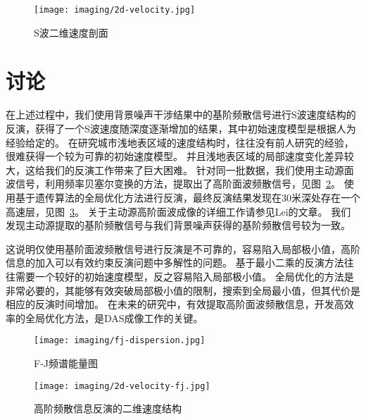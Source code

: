 \begin{figure}[h]
    \centering
    \texttt{[image: imaging/2d-velocity.jpg]}
    \caption{S波二维速度剖面}
    \label{fig:2d-velocity}
\end{figure}



\section{讨论}

在上述过程中，我们使用背景噪声干涉结果中的基阶频散信号进行S波速度结构的反演，获得了一个S波速度随深度逐渐增加的结果，其中初始速度模型是根据人为经验给定的。
在研究城市浅地表区域的速度结构时，往往没有前人研究的经验，很难获得一个较为可靠的初始速度模型。
并且浅地表区域的局部速度变化差异较大，这给我们的反演工作带来了巨大困难。
针对同一批数据，我们使用主动源面波信号，利用频率贝塞尔变换的方法，提取出了高阶面波频散信号，见图~\ref{fig:fj-dispersion}。
使用基于遗传算法的全局优化方法进行反演，最终反演结果发现在30米深处存在一个高速层，见图~\ref{fig:2d-velocity-fj}。
关于主动源高阶面波成像的详细工作请参见Lei的文章\citep{lei2021shallow}。
我们发现主动源提取的基阶频散信号与我们背景噪声获得的基阶频散信号较为一致。

这说明仅使用基阶面波频散信号进行反演是不可靠的，容易陷入局部极小值，高阶信息的加入可以有效约束反演问题中多解性的问题。
基于最小二乘的反演方法往往需要一个较好的初始速度模型，反之容易陷入局部极小值。
全局优化的方法是非常必要的，其能够有效突破局部极小值的限制，搜索到全局最小值，但其代价是相应的反演时间增加。
在未来的研究中，有效提取高阶面波频散信息，开发高效率的全局优化方法，是DAS成像工作的关键。


\begin{figure}[h]
    \centering
    \texttt{[image: imaging/fj-dispersion.jpg]}
    \caption{F-J频谱能量图}
    \label{fig:fj-dispersion}
\end{figure}

\begin{figure}[h]
    \centering
    \texttt{[image: imaging/2d-velocity-fj.jpg]}
    \caption{高阶频散信息反演的二维速度结构}
    \label{fig:2d-velocity-fj}
\end{figure}

% 